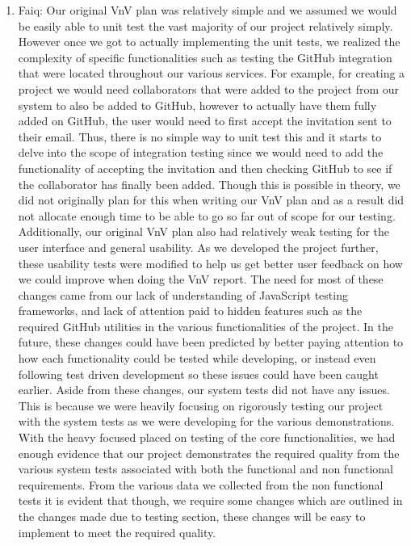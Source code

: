 \documentclass[12pt, titlepage]{article}
\begin{document}
\begin{enumerate}
    \item Faiq: Our original VnV plan was relatively simple and we assumed we would be easily able to unit test the vast majority of our project relatively simply. However once we got to actually implementing the unit tests, we realized the complexity of specific functionalities such as testing the GitHub integration that were located throughout our various services. For example, for creating a project we would need collaborators that were added to the project from our system to also be added to GitHub, however to actually have them fully added on GitHub, the user would need to first accept the invitation sent to their email. Thus, there is no simple way to unit test this and it starts to delve into the scope of integration testing since we would need to add the functionality of accepting the invitation and then checking GitHub to see if the collaborator has finally been added. Though this is possible in theory, we did not originally plan for this when writing our VnV plan and as a result did not allocate enough time to be able to go so far out of scope for our testing. Additionally, our original VnV plan also had relatively weak testing for the user interface and general usability. As we developed the project further, these usability tests were modified to help us get better user feedback on how we could improve when doing the VnV report. The need for most of these changes came from our lack of understanding of JavaScript testing frameworks, and lack of attention paid to hidden features such as the required GitHub utilities in the various functionalities of the project. In the future, these changes could have been predicted by better paying attention to how each functionality could be tested while developing, or instead even following test driven development so these issues could have been caught earlier. Aside from these changes, our system tests did not have any issues. This is because we were heavily focusing on rigorously testing our project with the system tests as we were developing for the various demonstrations. With the heavy focused placed on testing of the core functionalities, we had enough evidence that our project demonstrates the required quality from the various system tests associated with both the functional and non functional requirements. From the various data we collected from the non functional tests it is evident that though, we require some changes which are outlined in the changes made due to testing section, these changes will be easy to implement to meet the required quality.

\end{enumerate}
\end{document}
